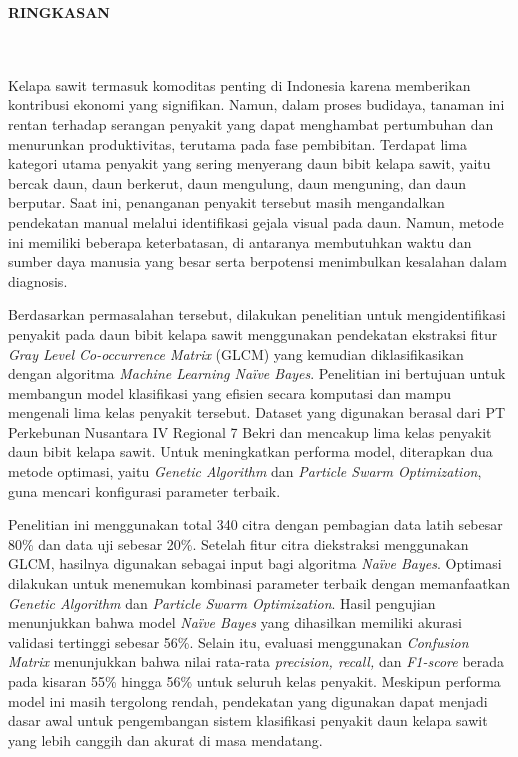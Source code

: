 \clearpage
{}%
\thispagestyle{fancy}

\begin{center}
	\large \bfseries \MakeUppercase{Ringkasan}\\
	\begingroup
	\normalsize \normalfont {\thetitle}\\
	\endgroup
	\normalsize \normalfont {\theauthor}\\
	\bigskip
	
	\normalsize \normalfont \justifying
	Kelapa sawit termasuk komoditas penting di Indonesia karena memberikan kontribusi ekonomi yang signifikan. Namun, dalam proses budidaya, tanaman ini rentan terhadap serangan penyakit yang dapat menghambat pertumbuhan dan menurunkan produktivitas, terutama pada fase pembibitan. Terdapat lima kategori utama penyakit yang sering menyerang daun bibit kelapa sawit, yaitu bercak daun, daun berkerut, daun mengulung, daun menguning, dan daun berputar. Saat ini, penanganan penyakit tersebut masih mengandalkan pendekatan manual melalui identifikasi gejala visual pada daun. Namun, metode ini memiliki beberapa keterbatasan, di antaranya membutuhkan waktu dan sumber daya manusia yang besar serta berpotensi menimbulkan kesalahan dalam diagnosis.  

	Berdasarkan permasalahan tersebut, dilakukan penelitian untuk mengidentifikasi penyakit pada daun bibit kelapa sawit menggunakan pendekatan ekstraksi fitur \textit{Gray Level Co-occurrence Matrix} (GLCM) yang kemudian diklasifikasikan dengan algoritma \textit{Machine Learning Naïve Bayes}. Penelitian ini bertujuan untuk membangun model klasifikasi yang efisien secara komputasi dan mampu mengenali lima kelas penyakit tersebut. Dataset yang digunakan berasal dari PT Perkebunan Nusantara IV Regional 7 Bekri dan mencakup lima kelas penyakit daun bibit kelapa sawit. Untuk meningkatkan performa model, diterapkan dua metode optimasi, yaitu \textit{Genetic Algorithm} dan \textit{Particle Swarm Optimization}, guna mencari konfigurasi parameter terbaik.

	Penelitian ini menggunakan total 340 citra dengan pembagian data latih sebesar 80\% dan data uji sebesar 20\%. Setelah fitur citra diekstraksi menggunakan GLCM, hasilnya digunakan sebagai input bagi algoritma \textit{Naïve Bayes}. Optimasi dilakukan untuk menemukan kombinasi parameter terbaik dengan memanfaatkan \textit{Genetic Algorithm} dan \textit{Particle Swarm Optimization}. Hasil pengujian menunjukkan bahwa model \textit{Naïve Bayes} yang dihasilkan memiliki akurasi validasi tertinggi sebesar 56\%. Selain itu, evaluasi menggunakan \textit{Confusion Matrix} menunjukkan bahwa nilai rata-rata \textit{precision, recall,} dan \textit{F1-score} berada pada kisaran 55\% hingga 56\% untuk seluruh kelas penyakit. Meskipun performa model ini masih tergolong rendah, pendekatan yang digunakan dapat menjadi dasar awal untuk pengembangan sistem klasifikasi penyakit daun kelapa sawit yang lebih canggih dan akurat di masa mendatang.
	\vfill
	
\end{center}
\clearpage